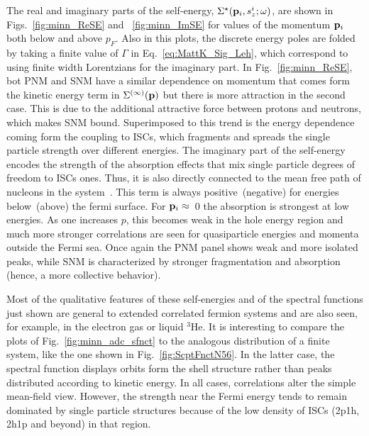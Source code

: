 The real and imaginary parts of the self-energy, $\Sigma^\star({\bf p}_i, s_z^i; \omega)$, are shown in Figs.~\ref{fig:minn_ReSE} and ~\ref{fig:minn_ImSE} for values of the 
momentum ${\bf p}_i$ both below and above $p_F$.  Also in this plots, the discrete energy poles are folded by taking a finite value of $\Gamma$ in Eq.~\eqref{eq:MattK_Sig_Leh},
which correspond to using finite width Lorentzians for the imaginary part.
%
In Fig.~\ref{fig:minn_ReSE}, bot PNM and SNM have a similar dependence on momentum that comes form the kinetic energy term in $\Sigma^{(\infty)}({\bf p})$ but there is more attraction in the second case. This is due to the additional attractive force between protons and neutrons, which makes SNM bound. Superimposed to this trend is the energy dependence  coming form the coupling to ISCs, which fragments and spreads the single particle strength over different energies. 
%
The imaginary part of the self-energy encodes the strength of the absorption effects that mix single particle degrees of freedom to ISCs ones. Thus, it is also directly connected to the mean free path of nucleons in the system~\cite{ch11_Rios2012MFP}. This term is always positive~(negative) for energies below~(above) the fermi surface. 
 For ${\bf p}_i\approx$~0 the absorption is strongest at low energies.  As one increases $p$, this becomes weak in the hole energy region and much more stronger correlations are seen for quasiparticle energies and momenta outside the Fermi sea.  Once again the PNM panel shows weak and more isolated peaks, while SNM is characterized by stronger fragmentation and absorption (hence,  a more collective behavior).



Most of the qualitative features of these self-energies and of the spectral functions just shown are general to extended correlated fermion systems and are  also seen, for example, in the electron gas or liquid $^3$He. It is interesting to compare the plots of Fig.~\ref{fig:minn_adc_sfnct} to the analogous distribution of a finite system, like the one shown in Fig.~\ref{fig:ScptFnctN56}. In the latter case, the spectral function displays orbits form the shell structure rather than peaks  distributed according to kinetic energy. In all cases, correlations alter the simple mean-field view. However, the strength near the Fermi energy tends to remain dominated by single particle structures because of the low density of ISCs (2p1h, 2h1p and beyond) in that region.



